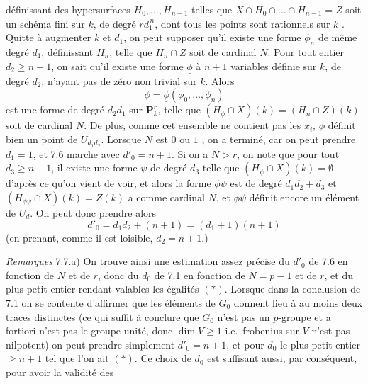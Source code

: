 \documentclass[11pt,a4paper]{article}
\begin{document}
définissant des hypersurfaces $H_0, \ldots, H_{n-1}$ telles que $X \cap H_0 \cap
\ldots \cap H_{n-1} = Z$ soit un schéma fini  sur $k$, de degré $r
d_1^{\,n}$, dont tous les points sont rationnels sur $k$ . Quitte à augmenter $k$ et $d_1$, on peut supposer qu'il existe une forme
$\phi_n$ de même degré $d_1$, définissant $H_n$, telle que $H_n \cap Z$ soit de
cardinal $N$. Pour tout entier $d_2 \geqslant n+1$, on sait qu'il existe une
forme $\underline{\phi}$ à $n+1$ variables définie sur $k$, de degré $d_2$,
n'ayant pas de zéro non trivial sur $k$. Alors
\[
\phi = \underline{\phi}(\phi_0, \ldots, \phi_n)
\]
est une forme de degré $d_2 d_1$ sur $\mathbf{P}^r_k$, telle que $(H_\phi \cap
X)(k) = (H_n \cap Z)(k)$ soit de cardinal $N$. De plus, comme cet ensemble ne
contient pas les $x_i$, $\phi$ définit bien un point de $U_{d_1 d_2}$. Lorsque
$N$ est $0$ ou $1$ , on a terminé, car
on peut prendre $d_1 = 1$, et 7.6 marche avec $d'_0 = n+1$. Si on a $N > r$, on
note que pour tout $d_3 \geqslant n+1$, il existe une forme $\psi$ de degré
$d_3$  telle que $(H_\psi \cap X)(k) = \emptyset$ d'après ce qu'on
vient de voir, et alors la forme $\phi\psi$ est de degré  $d_1 d_2 +
d_3$ et $(H_{\phi\psi} \cap X)(k) = Z(k)$ a comme cardinal $N$, et $\phi\psi$
définit encore un élément de $U_d$. On peut donc prendre alors
\[
d'_0 = d_1 d_2 + (n+1) = (d_1 + 1)(n+1)
\]
(en prenant, comme il est loisible, $d_2 = n+1$.)

\emph{Remarques} 7.7.\quad a) On trouve ainsi une estimation assez précise du
$d'_0$ de 7.6 en fonction de $N$ et de $r$, donc du $d_0$ de 7.1 en fonction de
$N = p-1$ et de $r$, et du plus petit entier rendant valables les égalités $(*)$.
Lorsque dans la conclusion de 7.1 on se contente d'affirmer que les éléments de
$G_0$ donnent lieu à au moins deux traces distinctes (ce qui suffit à conclure
que $G_0$ n'est pas un $p$-groupe et a fortiori n'est pas le groupe unité, donc
$\dim V \geqslant 1$ i.e.\ frobenius sur $V$ n'est pas nilpotent) on peut prendre
simplement $d'_0 = n+1$, et pour $d_0$ le plus petit entier $\geqslant n+1$ tel
que l'on ait $(*)$. Ce choix de $d_0$ est suffisant aussi, par conséquent, pour
avoir la validité des
\end{document}

